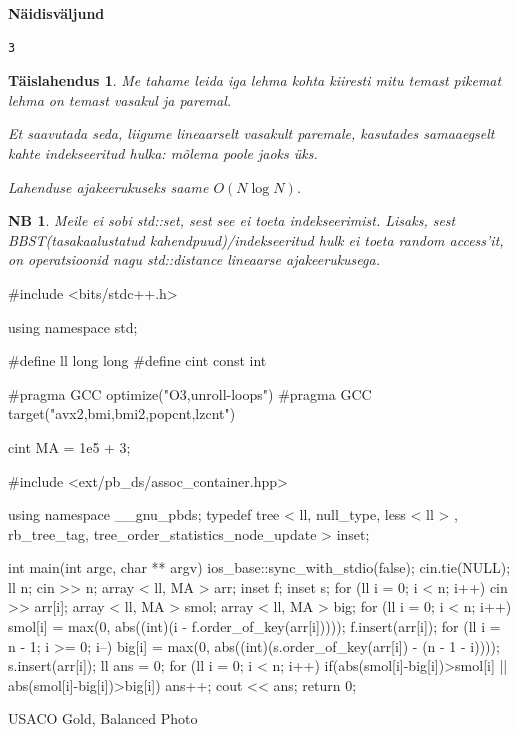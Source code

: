 \documentclass{trkut}
\newtheorem*{extra}{NB}
\newtheorem*{solution}{Täislahendus}
\begin{document}
\textbf{Näidisväljund}

\begin{verbatim}
3
\end{verbatim}


\begin{solution}
Me tahame leida iga lehma kohta kiiresti mitu temast pikemat lehma on temast vasakul ja paremal.

Et saavutada seda, liigume lineaarselt vasakult paremale, kasutades samaaegselt kahte indekseeritud hulka: mõlema poole jaoks üks.

Lahenduse ajakeerukuseks saame $O(N\log N)$.
\end{solution}

\begin{extra}
Meile ei sobi  std::set, sest see ei toeta indekseerimist. Lisaks, sest BBST(tasakaalustatud kahendpuud)/indekseeritud hulk ei toeta random access'it, on operatsioonid nagu std::distance lineaarse ajakeerukusega.
\end{extra}

\begin{cclol}
#include <bits/stdc++.h>

using namespace std;

#define ll long long
#define cint
const int

#pragma GCC optimize("O3,unroll-loops")
#pragma GCC target("avx2,bmi,bmi2,popcnt,lzcnt")

cint MA = 1e5 + 3;

#include <ext/pb_ds/assoc_container.hpp>

using namespace __gnu_pbds;
typedef tree < ll, null_type, less < ll > , rb_tree_tag, 
tree_order_statistics_node_update > inset;

int main(int argc, char ** argv) {
  ios_base::sync_with_stdio(false);
  cin.tie(NULL);
  ll n;
  cin >> n;
  array < ll, MA > arr;
  inset f;
  inset s;
  for (ll i = 0; i < n; i++) cin >> arr[i];
  array < ll, MA > smol;
  array < ll, MA > big;
  for (ll i = 0; i < n; i++) {
    smol[i] = max(0, abs((int)(i - f.order_of_key(arr[i]))));
    f.insert(arr[i]);
  }
  for (ll i = n - 1; i >= 0; i--) {
    big[i] = max(0, abs((int)(s.order_of_key(arr[i]) - (n - 1 - i))));
    s.insert(arr[i]);
  }
  ll ans = 0;
  for (ll i = 0; i < n; i++) {
  if(abs(smol[i]-big[i])>smol[i] || abs(smol[i]-big[i])>big[i]) ans++;
  }
  cout << ans;
  return 0;
}
    \end{cclol}
    \begin{kk}[H]
    \caption{USACO Gold, Balanced Photo}%
    \end{kk}
\end{document}
